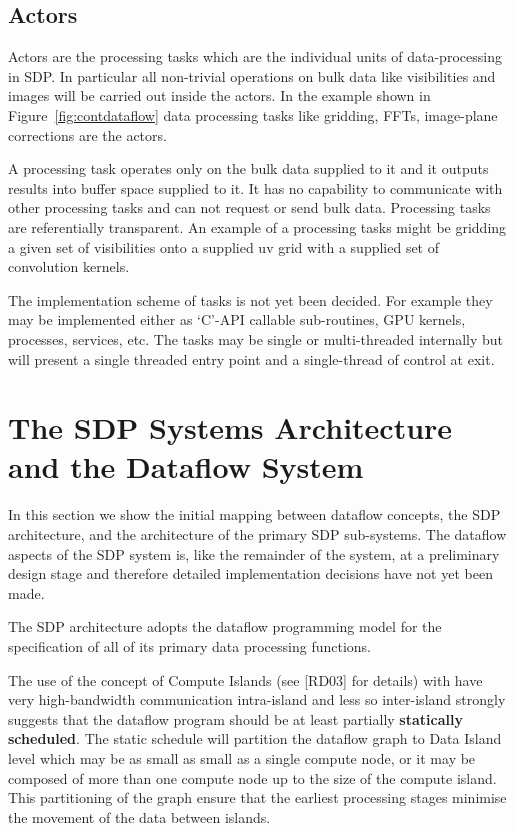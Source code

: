 \documentclass[11pt,a4paper]{article}
\begin{document}
\subsection{Actors}
Actors are the processing tasks which are the individual units of
data-processing in SDP. In particular all non-trivial operations on
bulk data like visibilities and images will be carried out inside the
actors. In the example shown in Figure~\ref{fig:contdataflow} data
processing tasks like gridding, FFTs, image-plane corrections are the
actors.

A processing task operates only on the bulk data supplied to it and it
outputs results into buffer space supplied to it. It has no capability
to communicate with other processing tasks and can not request or send
bulk data. Processing tasks are referentially transparent. An example
of a processing tasks might be gridding a given set of visibilities
onto a supplied uv grid with a supplied set of convolution kernels.

The implementation scheme of tasks is not yet been decided. For
example they may be implemented either as ‘C’-API callable
sub-routines, GPU kernels, processes, services, etc. The tasks may be
single or multi-threaded internally but will present a single threaded
entry point and a single-thread of control at exit.

\section{The SDP Systems Architecture and the Dataflow System}
\label{sec:sdp-syst-arch}

In this section we show the initial mapping between dataflow concepts,
the SDP architecture, and the architecture of the primary SDP
sub-systems. The dataflow aspects of the SDP system is, like the
remainder of the system, at a preliminary design stage and therefore
detailed implementation decisions have not yet been made.

The SDP architecture adopts the dataflow programming model for the
specification of all of its primary data processing functions. 

The use of the concept of Compute Islands (see [RD03] for details)
with have very high-bandwidth communication intra-island and less so
inter-island strongly suggests that the dataflow program should be at
least partially {\bf statically scheduled}.  The static schedule will
partition the dataflow graph to Data Island level which may be as
small as small as a single compute node, or it may be composed of more
than one compute node up to the size of the compute island. This
partitioning of the graph ensure that the earliest processing stages
minimise the movement of the data between islands.
\end{document}
